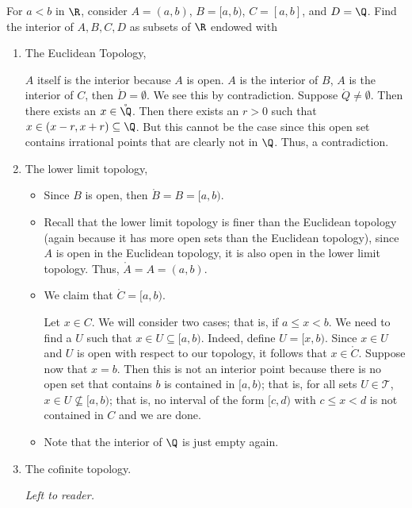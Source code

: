 \begin{problem}
    For \( a < b  \) in \( \R  \), consider \( A = (a,b) \), \( B = [a,b) \), \( C = [a,b] \), and \( D = \Q  \). Find the interior of \( A,B,C,D  \) as subsets of \( \R  \) endowed with 
    \begin{enumerate}
        \item[(i)] The Euclidean Topology,
            \begin{solution}
                \( A  \) itself is the interior because \( A  \) is open. \( A  \) is the interior of \( B \), \( A  \) is the interior of \( C \), then \( \mathring{D} = \emptyset \). We see this by contradiction. Suppose \( \mathring{Q} \neq \emptyset \). Then there exists an \( x \in \mathring{\Q} \). Then there exists an \( r > 0  \) such that \( x \in (x - r , x + r) \subseteq \Q  \). But this cannot be the case since this open set contains irrational points that are clearly not in \( \Q  \). Thus, a contradiction.
            \end{solution}
        \item[(ii)] The lower limit topology,
            \begin{solution}
                \begin{itemize}
                    \item Since \( B \) is open, then \( \mathring{B} = B = [a,b) \).
                    \item Recall that the lower limit topology is finer than the Euclidean topology (again because it has more open sets than the Euclidean topology), since \( A  \) is open in the Euclidean topology, it is also open in the lower limit topology.
      Thus, \( \mathring{A} = A = (a,b) \).
                    \item We claim that \( \mathring{C} = [a,b)  \). 

                        Let \( x \in C \). We will consider two cases; that is, if \( a \leq x < b  \). We need to find a \( U  \) such that \( x \in U \subseteq [a,b) \). Indeed, define \( U  = [x,b) \). Since \( x \in U  \) and \( U  \) is open with respect to our topology, it follows that \( x \in \mathring{C} \). Suppose now that \( x = b  \). Then this is not an interior point because there is no open set that contains \( b  \) is contained in \( [a,b) \); that is, for all sets \( U \in \mathcal{T} \), \( x \in U \not\subseteq [a,b)  \); that is, no interval of the form \( [c,d)  \) with \( c \leq x < d  \) is not contained in \( C  \) and we are done. 
                    \item Note that the interior of \( \Q  \) is just empty again.
                \end{itemize}
            \end{solution}
        \item[(iii)] The cofinite topology.
            \begin{solution}
                \textit{Left to reader.}   
            \end{solution}
    \end{enumerate}
\end{problem}

